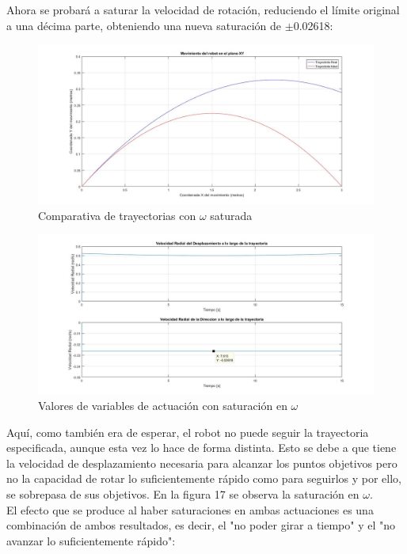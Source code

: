 \documentclass[a4paper,twoside]{article}
\begin{document}
	Ahora se probará a saturar la velocidad de rotación, reduciendo el límite original a una décima parte, obteniendo una nueva saturación de $\pm$0.02618:
	
	\begin{figure}[H]
		\centering
		\includegraphics[width=1\textwidth]{parab_6}
		\caption{Comparativa de trayectorias con $\omega$ saturada}
	\end{figure}
	
	\begin{figure}[H]
		\centering
		\includegraphics[width=1\textwidth]{parab_7}
		\caption{Valores de variables de actuación con saturación en $\omega$}
	\end{figure}

	Aquí, como también era de esperar, el robot no puede seguir la trayectoria especificada, aunque esta vez lo hace de forma distinta. Esto se debe a que tiene la velocidad de desplazamiento necesaria para alcanzar los puntos objetivos pero no la capacidad de rotar lo suficientemente rápido como para seguirlos y por ello, se sobrepasa de sus objetivos. En la figura 17 se observa la saturación en $\omega$.\\
	
	El efecto que se produce al haber saturaciones en ambas actuaciones es una combinación de ambos resultados, es decir, el "no poder girar a tiempo" y el "no avanzar lo suficientemente rápido":
	
\end{document}
